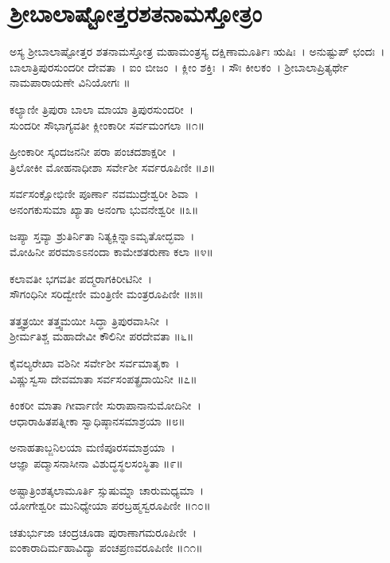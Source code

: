 \section{ಶ್ರೀಬಾಲಾಷ್ಟೋತ್ತರಶತನಾಮಸ್ತೋತ್ರಂ}
ಅಸ್ಯ ಶ್ರೀಬಾಲಾಷ್ಟೋತ್ತರ ಶತನಾಮಸ್ತೋತ್ರ ಮಹಾಮಂತ್ರಸ್ಯ  ದಕ್ಷಿಣಾಮೂರ್ತಿಃ ಋಷಿಃ~। ಅನುಷ್ಟುಪ್ ಛಂದಃ~। ಬಾಲಾತ್ರಿಪುರಸುಂದರೀ ದೇವತಾ~। ಐಂ ಬೀಜಂ~। ಕ್ಲೀಂ ಶಕ್ತಿಃ~। ಸೌಃ ಕೀಲಕಂ~।  ಶ್ರೀಬಾಲಾಪ್ರಿತ್ಯರ್ಥೇ ನಾಮಪಾರಾಯಣೇ ವಿನಿಯೋಗಃ ॥


ಕಲ್ಯಾಣೀ ತ್ರಿಪುರಾ ಬಾಲಾ ಮಾಯಾ ತ್ರಿಪುರಸುಂದರೀ~।\\
ಸುಂದರೀ ಸೌಭಾಗ್ಯವತೀ ಕ್ಲೀಂಕಾರೀ ಸರ್ವಮಂಗಲಾ ॥೧॥

ಹ್ರೀಂಕಾರೀ ಸ್ಕಂದಜನನೀ ಪರಾ ಪಂಚದಶಾಕ್ಷರೀ~।\\
ತ್ರಿಲೋಕೀ ಮೋಹನಾಧೀಶಾ ಸರ್ವೇಶೀ ಸರ್ವರೂಪಿಣೀ ॥೨॥

ಸರ್ವಸಂಕ್ಷೋಭಿಣೀ ಪೂರ್ಣಾ ನವಮುದ್ರೇಶ್ವರೀ ಶಿವಾ~।\\
ಅನಂಗಕುಸುಮಾ ಖ್ಯಾತಾ ಅನಂಗಾ ಭುವನೇಶ್ವರೀ ॥೩॥

ಜಪ್ಯಾ ಸ್ತವ್ಯಾ ಶ್ರುತಿರ್ನಿತಾ ನಿತ್ಯಕ್ಲಿನ್ನಾಽಮೃತೋದ್ಭವಾ~।\\
ಮೋಹಿನೀ ಪರಮಾಽಽನಂದಾ ಕಾಮೇಶತರುಣಾ ಕಲಾ ॥೪॥

ಕಲಾವತೀ ಭಗವತೀ ಪದ್ಮರಾಗಕಿರೀಟಿನೀ~।\\
ಸೌಗಂಧಿನೀ ಸರಿದ್ವೇಣೀ ಮಂತ್ರಿಣೀ ಮಂತ್ರರೂಪಿಣೀ ॥೫॥

ತತ್ತ್ವತ್ರಯೀ ತತ್ತ್ವಮಯೀ ಸಿದ್ಧಾ ತ್ರಿಪುರವಾಸಿನೀ~।\\
ಶ್ರೀರ್ಮತಿಶ್ಚ ಮಹಾದೇವೀ ಕೌಲಿನೀ ಪರದೇವತಾ ॥೬॥

ಕೈವಲ್ಯರೇಖಾ ವಶಿನೀ ಸರ್ವೇಶೀ ಸರ್ವಮಾತೃಕಾ~।\\
ವಿಷ್ಣುಸ್ವಸಾ ದೇವಮಾತಾ ಸರ್ವಸಂಪತ್ಪ್ರದಾಯಿನೀ ॥೭॥

ಕಿಂಕರೀ ಮಾತಾ ಗೀರ್ವಾಣೀ ಸುರಾಪಾನಾನುಮೋದಿನೀ~।\\
ಆಧಾರಾಹಿತಪತ್ನೀಕಾ ಸ್ವಾಧಿಷ್ಠಾನಸಮಾಶ್ರಯಾ ॥೮॥

ಅನಾಹತಾಬ್ಜನಿಲಯಾ ಮಣಿಪೂರಸಮಾಶ್ರಯಾ~।\\
ಆಜ್ಞಾ ಪದ್ಮಾಸನಾಸೀನಾ ವಿಶುದ್ಧಸ್ಥಲಸಂಸ್ಥಿತಾ ॥೯॥

ಅಷ್ಟಾತ್ರಿಂಶತ್ಕಲಾಮೂರ್ತಿ ಸ್ಸುಷುಮ್ನಾ ಚಾರುಮಧ್ಯಮಾ~।\\
ಯೋಗೇಶ್ವರೀ ಮುನಿಧ್ಯೇಯಾ ಪರಬ್ರಹ್ಮಸ್ವರೂಪಿಣೀ ॥೧೦॥

ಚತುರ್ಭುಜಾ ಚಂದ್ರಚೂಡಾ ಪುರಾಣಾಗಮರೂಪಿಣೀ~।\\
ಐಂಕಾರಾದಿರ್ಮಹಾವಿದ್ಯಾ ಪಂಚಪ್ರಣವರೂಪಿಣೀ ॥೧೧॥

